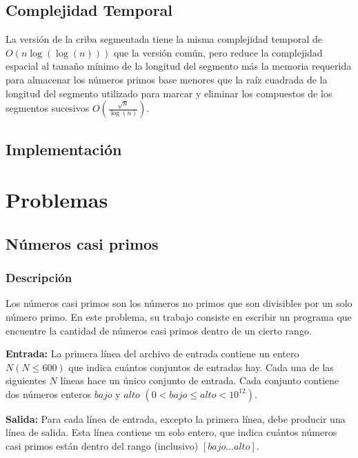\documentclass[12pt]{article}
\newcommand{\nl}{\vspace{0.3cm}}
\begin{document}
\subsection{Complejidad Temporal}

\nl

La versión de la criba segmentada tiene la misma complejidad temporal de $O(n \log(\log(n)))$ que la versión común, pero reduce la complejidad espacial al tamaño mínimo de la longitud del segmento más la memoria requerida para almacenar los números primos base menores que la raíz cuadrada de la longitud del segmento utilizado para marcar y eliminar los compuestos de los segmentos sucesivos $O\left(\frac{\sqrt{n}}{\log(n)}\right)$.

\subsection{Implementación}



\section{Problemas}

\subsection{Números casi primos}

\nl

\subsubsection{Descripción}

Los números casi primos son los números no primos que son divisibles por un solo número primo. En este problema, su trabajo consiste en escribir un programa que encuentre la cantidad de números casi primos dentro de un cierto rango.

\nl

\textbf{Entrada:} La primera línea del archivo de entrada contiene un entero $N (N \leqslant 600)$ que indica cuántos conjuntos de entradas hay. Cada una de las siguientes $N$ líneas hace un único conjunto de entrada. Cada conjunto contiene dos números enteros $bajo$ y $alto$ $(0 < bajo \leqslant alto < 10^{12})$.

\nl

\textbf{Salida:} Para cada línea de entrada, excepto la primera línea, debe producir una línea de salida. Esta línea contiene un solo entero, que indica cuántos números casi primos están dentro del rango (inclusivo) $[bajo ... alto]$.
\end{document}
